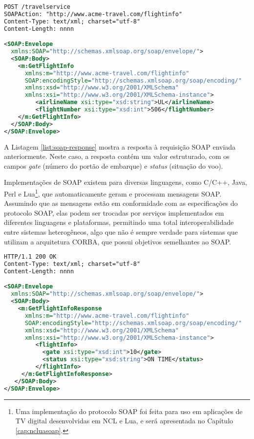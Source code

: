 \begin{lstlisting}[language=xml]
POST /travelservice
SOAPAction: "http://www.acme-travel.com/flightinfo"
Content-Type: text/xml; charset="utf-8"
Content-Length: nnnn

<SOAP:Envelope 
  xmlns:SOAP="http://schemas.xmlsoap.org/soap/envelope/">
  <SOAP:Body>
    <m:GetFlightInfo
      xmlns:m="http://www.acme-travel.com/flightinfo"
      SOAP:encodingStyle="http://schemas.xmlsoap.org/soap/encoding/"
      xmlns:xsd="http://www.w3.org/2001/XMLSchema"
      xmlns:xsi="http://www.w3.org/2001/XMLSchema-instance">
         <airlineName xsi:type="xsd:string">UL</airlineName>
         <flightNumber xsi:type="xsd:int">506</flightNumber>
    </m:GetFlightInfo>
  </SOAP:Body>
</SOAP:Envelope>
\end{lstlisting}

A Listagem \ref{list:soap-response} mostra a resposta à requisição SOAP enviada
anteriormente. Neste caso, a resposta contém um valor estruturado, com
os campos \textit{gate} (número do portão de embarque) e \textit{status} (situação do voo).

Implementações de SOAP existem para diversas linguagens, como C/C++, Java, Perl e Lua\footnote{Uma implementação
do protocolo SOAP foi feita para uso em aplicações de TV digital desenvolvidas em NCL e Lua, e será apresentada no Capítulo \ref{cap:ncluasoap}.}, que automaticamente geram e processam mensagens SOAP.
Assumindo que as mensagens estão em conformidade com as especificações do protocolo SOAP,
elas podem ser trocadas por serviços implementados em diferentes linguagens e plataformas,
permitindo uma total interoperabilidade entre sistemas heterogêneos, algo que não é sempre
verdade para sistemas que utilizam a arquitetura CORBA, que possui objetivos semelhantes ao SOAP.

\begin{lstlisting}[language=xml]
HTTP/1.1 200 OK
Content-Type: text/xml; charset="utf-8"
Content-Length: nnnn

<SOAP:Envelope 
  xmlns:SOAP="http://schemas.xmlsoap.org/soap/envelope/">
  <SOAP:Body>
    <m:GetFlightInfoResponse 
      xmlns:m="http://www.acme-travel.com/flightinfo"
      SOAP:encodingStyle="http://schemas.xmlsoap.org/soap/encoding/"
      xmlns:xsd="http://www.w3.org/2001/XMLSchema"
      xmlns:xsi="http://www.w3.org/2001/XMLSchema-instance">
         <flightInfo>
           <gate xsi:type="xsd:int">10</gate>
           <status xsi:type="xsd:string">ON TIME</status>
         </flightInfo>
     </m:GetFlightInfoResponse>
   </SOAP:Body>
</SOAP:Envelope>
\end{lstlisting}

